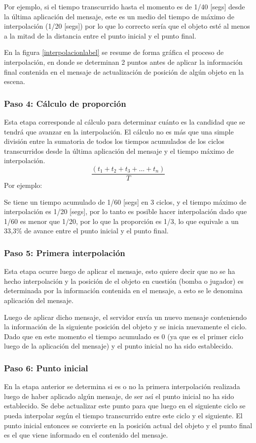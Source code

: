 \documentclass[a4paper,12pt,openany,oneside]{book}
\begin{document}
Por ejemplo, si el tiempo transcurrido hasta el momento es de 1/40 [segs] desde la última aplicación del mensaje, este es un medio del tiempo de máximo de interpolación (1/20 [segs]) por lo que lo correcto sería que el objeto esté al menos a la mitad de la distancia entre el punto inicial y el punto final.

En la figura \ref{interpolacionlabel} se resume de forma gráfica el proceso de interpolación, en donde se determinan 2 puntos antes de aplicar la información final contenida en el mensaje de actualización de posición de algún objeto en la escena.
\subsubsection{Paso 4: Cálculo de proporción}
Esta etapa corresponde al cálculo para determinar cuánto es la candidad que se tendrá que avanzar en la interpolación. El cálculo no es más que una simple división entre la sumatoria de todos los tiempos acumulados de los ciclos transcurridos desde la última aplicación del mensaje y el tiempo máximo de interpolación.
$$\frac{(t_1 + t_2 + t_3 + ... + t_n )}{T}$$
Por ejemplo:

Se tiene un tiempo acumulado de 1/60 [segs] en 3 ciclos, y el tiempo máximo de interpolación es 1/20 [segs], por lo tanto es posible hacer interpolación dado que 1/60 es menor que 1/20, por lo que la proporción es 1/3, lo que equivale a un 33,3\% de avance entre el punto inicial y el punto final.
\subsubsection{Paso 5: Primera interpolación}
Esta etapa ocurre luego de aplicar el mensaje, esto quiere decir que no se ha hecho interpolación y la posición de el objeto en cuestión (bomba o jugador) es determinada por la información contenida en el mensaje, a esto se le denomina aplicación del mensaje.

Luego de aplicar dicho mensaje, el servidor envía un nuevo mensaje conteniendo la información de la siguiente posición del objeto y se inicia nuevamente el ciclo. Dado que en este momento el tiempo acumulado es 0 (ya que es el primer ciclo luego de la aplicación del mensaje) y el punto inicial no ha sido establecido.
\subsubsection{Paso 6: Punto inicial}
En la etapa anterior se determina si es o no la primera interpolación realizada luego de haber aplicado algún mensaje, de ser así el punto inicial no ha sido establecido. Se debe actualizar este punto para que luego en el siguiente ciclo se pueda interpolar según el tiempo transcurrido entre este ciclo y el siguiente. El punto inicial entonces se convierte en la posición actual del objeto y el punto final es el que viene informado en el contenido del mensaje.
\end{document}
